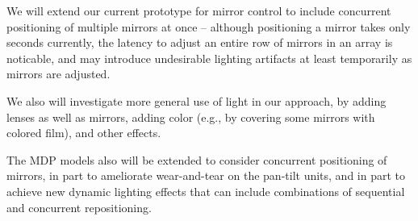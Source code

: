 We will extend our current prototype for mirror control to include concurrent positioning
of multiple mirrors at once -- although positioning a mirror takes only seconds currently,
the latency to adjust an entire row of mirrors in an array is noticable, and may introduce
undesirable lighting artifacts at least temporarily as mirrors are adjusted.

We also will investigate more general use of light in our approach, by adding
lenses as well as mirrors, adding color (e.g., by covering some mirrors with colored film),
and other effects. 


The MDP models also will be extended to consider concurrent positioning of mirrors, in
part to ameliorate wear-and-tear on the pan-tilt units, and in part to achieve new dynamic
lighting effects that can include combinations of sequential and concurrent repositioning.

